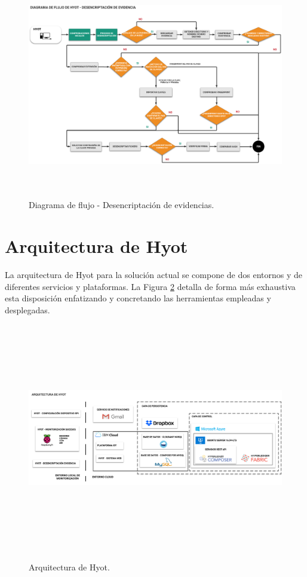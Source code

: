 \documentclass[12pt,a4paper, twoside]{report}
\begin{document}
  	\begin{figure}[!ht]   
		\caption{Diagrama de flujo - Desencriptación de evidencias.} 
		\begin{center} 
	 		\includegraphics[width=18cm,height=9.2cm]{Images/implement/hyot_decryptionflow} \\
			\label{fig:hyot_decryptionflow} 
		\end{center}  
	\end{figure}
		
	\section{Arquitectura de Hyot}
	
	La arquitectura de Hyot para la solución actual se compone de dos entornos y de diferentes servicios y plataformas. La Figura \ref{fig:hyot_architecture} detalla de forma más exhaustiva esta disposición enfatizando y concretando las herramientas empleadas y desplegadas.
	
		\begin{figure}[!ht]   
			\caption{Arquitectura de Hyot.} 
			\begin{center} 
	 			\includegraphics[width=18cm,height=10cm]{Images/implement/hyot_architecture} \\
				\label{fig:hyot_architecture} 
			\end{center}  
		\end{figure}
			
\end{document}
